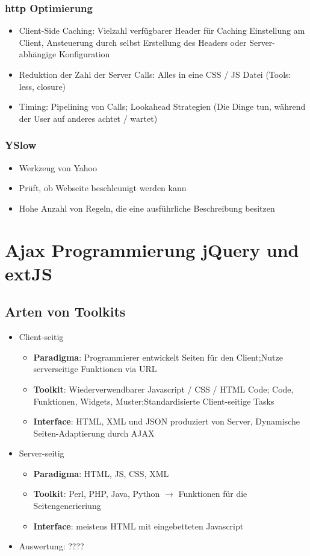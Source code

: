 \documentclass{article} %
\begin{document}
	\subsubsection{http Optimierung}
	\begin{itemize}
		\item Client-Side Caching: Vielzahl verfügbarer Header für Caching Einstellung am Client, Ansteuerung durch selbst Erstellung des Headers oder Server-abhängige Konfiguration
		\item Reduktion der Zahl der Server Calls: Alles in eine CSS / JS Datei (Tools: less, closure)
		\item Timing: Pipelining von Calls; Lookahead Strategien (Die Dinge tun, während der User auf anderes achtet / wartet)
	\end{itemize}
	\subsubsection{YSlow}
	\begin{itemize}
		\item Werkzeug von Yahoo
		\item Prüft, ob Webseite beschleunigt werden kann
		\item Hohe Anzahl von Regeln, die eine ausführliche Beschreibung besitzen
	\end{itemize}
\section{Ajax Programmierung jQuery und extJS}
	\subsection{Arten von Toolkits}
	\begin{itemize}
		\item Client-seitig
			\begin{itemize}
				\item \textbf{Paradigma}: Programmierer entwickelt Seiten für den Client;Nutze serverseitige Funktionen via URL
				\item \textbf{Toolkit}: Wiederverwendbarer Javascript / CSS / HTML Code; Code, Funktionen, Widgets, Muster;Standardisierte Client-seitige Tasks
				\item \textbf{Interface}: HTML, XML und JSON produziert von Server, Dynamische Seiten-Adaptierung durch AJAX
			\end{itemize}
		\item Server-seitig
			\begin{itemize}
				\item \textbf{Paradigma}: HTML, JS, CSS, XML
				\item \textbf{Toolkit}: Perl, PHP, Java, Python $\rightarrow$ Funktionen für die Seitengenerieriung
				\item \textbf{Interface}: meistens HTML mit eingebetteten Javascript
			\end{itemize}
		\item Auswertung: ????
	\end{itemize}		
\end{document}
